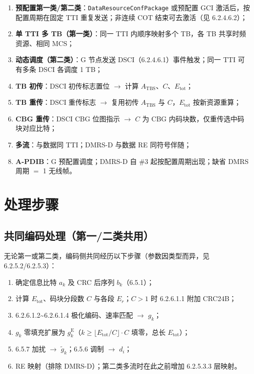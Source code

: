 \documentclass[11pt,a4paper]{ctexart}
\begin{document}
\begin{enumerate}[nosep]
  \item \textbf{预配置第一类/第二类}：\texttt{DataResourceConfPackage} 或预配置 GCI 激活后，按配置周期在固定 TTI 重复发送；非连续 COT 结束可去激活（见 6.2.4.6.2）；
  \item \textbf{单 TTI 多 TB（第一类）}：同一 TTI 内顺序映射多个 TB，各 TB 共享时频资源、相同 MCS；
  \item \textbf{动态调度（第二类）}：G 节点发送 DSCI（6.2.4.6.1）事件触发；同一 TTI 可有多条 DSCI 各调度 1 TB；
  \item \textbf{TB 初传}：DSCI 初传标志置位 $\rightarrow$ 计算 $A_{\mathrm{TBS}}$、$C$、$E_{\mathrm{tot}}$；
  \item \textbf{TB 重传}：DSCI 重传标志 $\rightarrow$ 复用初传 $A_{\mathrm{TBS}}$ 与 $C$，$E_{\mathrm{tot}}$ 按新资源重算；
  \item \textbf{CBG 重传}：DSCI CBG 位图指示 $\rightarrow$ $C$ 为 CBG 内码块数，仅重传选中码块对应比特；
  \item \textbf{多流}：与数据同 TTI；DMRS-D 与数据 RE 同符号伴随；
  \item \textbf{A-PDIB}：G 预配置调度；DMRS-D 自 \#3 起按配置周期出现；缺省 DMRS 周期 $=$ 1 无线帧。
\end{enumerate}

\section{处理步骤}

\subsection{共同编码处理（第一/二类共用）}

无论第一或第二类，编码侧共同经历以下步骤（参数因类型而异，见 6.2.5.2/6.2.5.3）：
\begin{enumerate}[nosep]
  \item 确定信息比特 $a_k$ 及 CRC 后序列 $b_k$（6.5.1）；
  \item 计算 $E_{\mathrm{tot}}$、码块分段数 $C$ 与各段 $E_r$；$C>1$ 时 6.2.6.1.1 附加 CRC24B；
  \item 6.2.6.1.2\textasciitilde 6.2.6.1.4 极化编码、速率匹配 $\rightarrow$ $g_k$；
  \item $g_k$ 零填充扩展为 $g^{\mathrm{E}}_k$（$k \geq \lfloor E_{\mathrm{tot}}/C \rfloor \cdot C$ 填零，总长 $E_{\mathrm{tot}}$）；
  \item 6.5.7 加扰 $\rightarrow$ $\tilde{g}_k$；6.5.6 调制 $\rightarrow$ $d_i$；
  \item RE 映射（排除 DMRS-D）；第二类多流时在此之前增加 6.2.5.3.3 层映射。
\end{enumerate}
\end{document}
